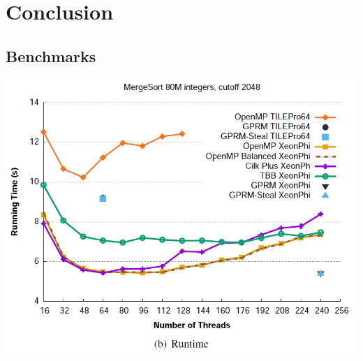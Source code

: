 \chapter{Conclusion}


\section{Benchmarks}



\begin{center}
\includegraphics[scale=0.5]{graphs/benchmark.png}
\end{center}
